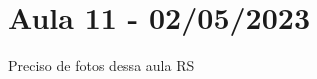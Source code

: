 \documentclass[Algebra/algebra_notes.tex]{subfiles}
\begin{document}
\section{Aula 11 - 02/05/2023}
Preciso de fotos dessa aula RS
\newpage
\end{document}
